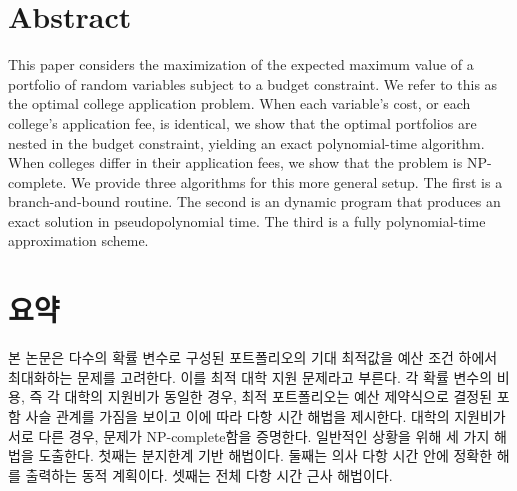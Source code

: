 \documentclass[12pt]{article} %
\author{Max Kapur}
\date{\today}                %
\theoremstyle{definition}
\theoremstyle{definition}
\begin{document}
\maketitle

\section*{Abstract}
This paper considers the maximization of the expected maximum value of a portfolio of random variables subject to a budget constraint. We refer to this as the optimal college application problem. When each variable's cost, or each college's application fee, is identical, we show that the optimal portfolios are nested in the budget constraint, yielding an exact polynomial-time algorithm. When colleges differ in their application fees, we show that the problem is NP-complete. We provide three algorithms for this more general setup. The first is a branch-and-bound routine. The second is an dynamic program that produces an exact solution in pseudopolynomial time. The third is a fully polynomial-time approximation scheme. 

\section*{요약}
본 논문은 다수의 확률 변수로 구성된 포트폴리오의 기대 최적값을 예산 조건 하에서 최대화하는 문제를 고려한다. 이를 최적 대학 지원 문제라고 부른다. 각 확률 변수의 비용, 즉 각 대학의 지원비가 동일한 경우, 최적 포트폴리오는 예산 제약식으로 결정된 포함 사슬 관계를 가짐을 보이고 이에 따라 다항 시간 해법을 제시한다. 대학의 지원비가 서로 다른 경우, 문제가 NP-complete함을 증명한다. 일반적인 상황을 위해 세 가지 해법을 도출한다. 첫째는 분지한계 기반 해법이다. 둘째는 의사 다항 시간 안에 정확한 해를 출력하는 동적 계획이다. 셋째는 전체 다항 시간 근사 해법이다.

\pagebreak

\tableofcontents
\end{document}
